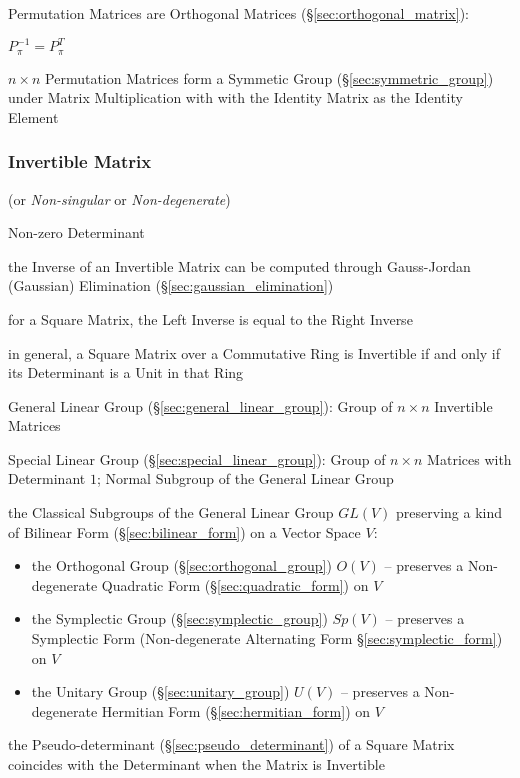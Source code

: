 Permutation Matrices are Orthogonal Matrices (\S\ref{sec:orthogonal_matrix}):

$P_\pi^{-1} = P_\pi^T$

$n \times n$ Permutation Matrices form a Symmetic Group
(\S\ref{sec:symmetric_group}) under Matrix Multiplication with
with the Identity Matrix as the Identity Element



\subsubsection{Invertible Matrix}\label{sec:invertible_matrix}

(or \emph{Non-singular} or \emph{Non-degenerate})

Non-zero Determinant

\fist the Inverse of an Invertible Matrix can be computed through Gauss-Jordan
(Gaussian) Elimination (\S\ref{sec:gaussian_elimination})

for a Square Matrix, the Left Inverse is equal to the Right Inverse

in general, a Square Matrix over a Commutative Ring is Invertible if and only
if its Determinant is a Unit in that Ring

\fist General Linear Group (\S\ref{sec:general_linear_group}): Group of $n
\times n$ Invertible Matrices

\fist Special Linear Group (\S\ref{sec:special_linear_group}): Group of $n
\times n$ Matrices with Determinant $1$; Normal Subgroup of the General Linear
Group

the Classical Subgroups of the General Linear Group $GL(V)$ preserving a kind
of Bilinear Form (\S\ref{sec:bilinear_form}) on a Vector Space $V$:
\begin{itemize}
  \item the Orthogonal Group (\S\ref{sec:orthogonal_group}) $O(V)$ -- preserves
    a Non-degenerate Quadratic Form (\S\ref{sec:quadratic_form}) on $V$
  \item the Symplectic Group (\S\ref{sec:symplectic_group}) $Sp(V)$
    -- preserves a Symplectic Form (Non-degenerate Alternating Form
    \S\ref{sec:symplectic_form}) on $V$
  \item the Unitary Group (\S\ref{sec:unitary_group}) $U(V)$
    -- preserves a Non-degenerate Hermitian Form (\S\ref{sec:hermitian_form})
    on $V$
\end{itemize}

the Pseudo-determinant (\S\ref{sec:pseudo_determinant}) of a Square Matrix
coincides with the Determinant when the Matrix is Invertible

